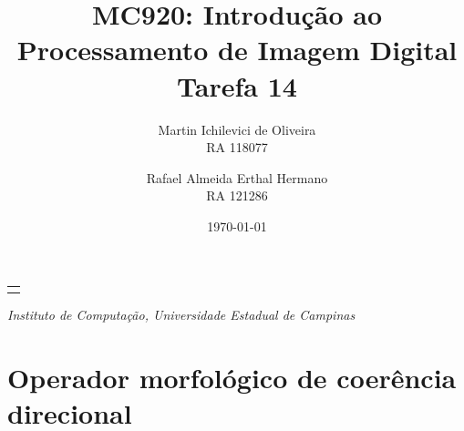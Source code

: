 \documentclass[10pt,a4paper]{article}
\makeatletter
\let\@institution\empty
\def\institution#1{\def\@institution{#1}}
\renewcommand{\maketitle}{
    \begin{center}
        {\Large\bfseries\@title\par\medskip}
        {\large
            \begin{tabular}[t]{c}%
                \@author
        \end{tabular}\par\medskip}
        {\itshape\@institution\par}
        {\itshape\@date\par}
\end{center}}
\makeatother
\begin{document}

\title{MC920: Introdução ao Processamento de Imagem Digital\\Tarefa 14}
\author{
    \begin{minipage}{6cm}
        \centering
        Martin Ichilevici de Oliveira\\
        RA 118077
    \end{minipage}
    \and
    \begin{minipage}{6cm}
        \centering
        Rafael Almeida Erthal Hermano\\
        RA 121286
    \end{minipage}
}
\institution{Instituto de Computação, Universidade Estadual de Campinas}
\date{\today}

\maketitle

\section{Operador morfológico de coerência direcional}
\end{document}
